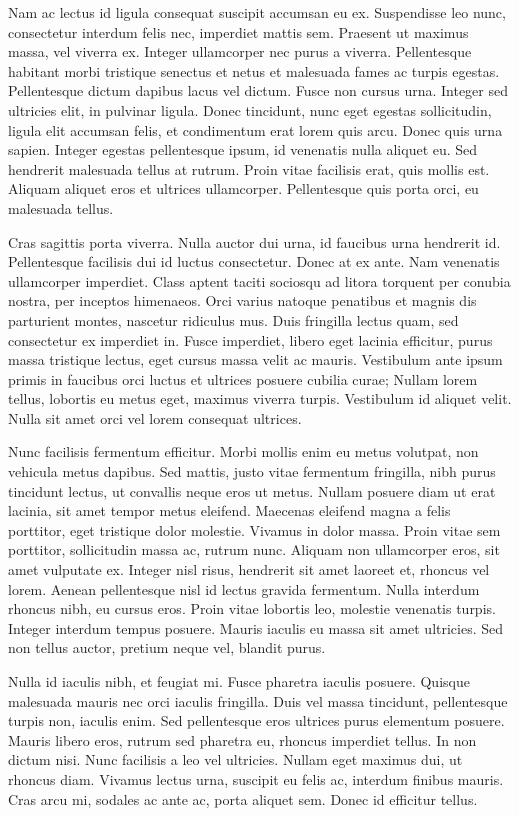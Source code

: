 Nam ac lectus id ligula consequat suscipit accumsan eu ex. Suspendisse leo nunc, consectetur interdum felis nec, imperdiet mattis sem. Praesent ut maximus massa, vel viverra ex. Integer ullamcorper nec purus a viverra. Pellentesque habitant morbi tristique senectus et netus et malesuada fames ac turpis egestas. Pellentesque dictum dapibus lacus vel dictum. Fusce non cursus urna. Integer sed ultricies elit, in pulvinar ligula. Donec tincidunt, nunc eget egestas sollicitudin, ligula elit accumsan felis, et condimentum erat lorem quis arcu. Donec quis urna sapien. Integer egestas pellentesque ipsum, id venenatis nulla aliquet eu. Sed hendrerit malesuada tellus at rutrum. Proin vitae facilisis erat, quis mollis est. Aliquam aliquet eros et ultrices ullamcorper. Pellentesque quis porta orci, eu malesuada tellus.

Cras sagittis porta viverra. Nulla auctor dui urna, id faucibus urna hendrerit id. Pellentesque facilisis dui id luctus consectetur. Donec at ex ante. Nam venenatis ullamcorper imperdiet. Class aptent taciti sociosqu ad litora torquent per conubia nostra, per inceptos himenaeos. Orci varius natoque penatibus et magnis dis parturient montes, nascetur ridiculus mus. Duis fringilla lectus quam, sed consectetur ex imperdiet in. Fusce imperdiet, libero eget lacinia efficitur, purus massa tristique lectus, eget cursus massa velit ac mauris. Vestibulum ante ipsum primis in faucibus orci luctus et ultrices posuere cubilia curae; Nullam lorem tellus, lobortis eu metus eget, maximus viverra turpis. Vestibulum id aliquet velit. Nulla sit amet orci vel lorem consequat ultrices.

Nunc facilisis fermentum efficitur. Morbi mollis enim eu metus volutpat, non vehicula metus dapibus. Sed mattis, justo vitae fermentum fringilla, nibh purus tincidunt lectus, ut convallis neque eros ut metus. Nullam posuere diam ut erat lacinia, sit amet tempor metus eleifend. Maecenas eleifend magna a felis porttitor, eget tristique dolor molestie. Vivamus in dolor massa. Proin vitae sem porttitor, sollicitudin massa ac, rutrum nunc. Aliquam non ullamcorper eros, sit amet vulputate ex. Integer nisl risus, hendrerit sit amet laoreet et, rhoncus vel lorem. Aenean pellentesque nisl id lectus gravida fermentum. Nulla interdum rhoncus nibh, eu cursus eros. Proin vitae lobortis leo, molestie venenatis turpis. Integer interdum tempus posuere. Mauris iaculis eu massa sit amet ultricies. Sed non tellus auctor, pretium neque vel, blandit purus.

Nulla id iaculis nibh, et feugiat mi. Fusce pharetra iaculis posuere. Quisque malesuada mauris nec orci iaculis fringilla. Duis vel massa tincidunt, pellentesque turpis non, iaculis enim. Sed pellentesque eros ultrices purus elementum posuere. Mauris libero eros, rutrum sed pharetra eu, rhoncus imperdiet tellus. In non dictum nisi. Nunc facilisis a leo vel ultricies. Nullam eget maximus dui, ut rhoncus diam. Vivamus lectus urna, suscipit eu felis ac, interdum finibus mauris. Cras arcu mi, sodales ac ante ac, porta aliquet sem. Donec id efficitur tellus.

